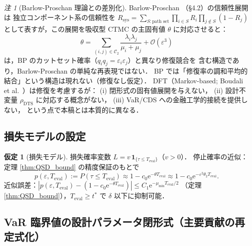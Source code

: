 \documentclass[12pt,a4paper]{article}
\theoremstyle{plain}
\theoremstyle{definition}
\newtheorem{assumption}[theorem]{仮定}
\theoremstyle{remark}
\newtheorem{remark}[theorem]{注}
\newcommand{\calO}{\mathcal{O}}
\newcommand{\eps}{\varepsilon}
\newcommand{\e}{\mathrm{e}}
\newcommand{\calCtwo}{\mathcal{C}_2}
\newcommand{\rhoDTS}{\rho_{\mathrm{DTS}}}
\newcommand{\Teval}{T_{\mathrm{eval}}}
\begin{document}
\begin{remark}[Barlow-Proschan 理論との差別化]
  Barlow-Proschan \cite{barlow1965}（§4.2）の信頼性展開は
  独立コンポーネント系の信頼性を
  $R_{\mathrm{sys}} = \sum_{S:\text{path set}}\prod_{i\in S}R_i\prod_{j\notin S}(1-R_j)$
  として表すが，この展開を吸収型 CTMC の主固有値 $\theta$ に対応させると：
  \begin{equation}
    \theta = \sum_{(i,j)\in\calCtwo}\frac{\lambda_i\lambda_j}{\mu_i+\mu_j} + \calO(\eps^3)
  \end{equation}
  は，BP のカットセット確率（$q_iq_j=\eps_i\eps_j$）と異なり修復競合を
  含む構造であり，Barlow-Proschan の単純な再表現ではない．
  BP では「修復率の調和平均的結合」という構造は現れない（修復なし仮定）．
  DFT（Markov-based; Boudali et al.~\cite{boudali2010}）は修復を考慮するが：
  (i) 閉形式の固有値展開を与えない，
  (ii) 設計不変量 $\rhoDTS$ に対応する概念がない，
  (iii) VaR/CDS への金融工学的接続を提供しない，
  という点で本稿とは本質的に異なる．
\end{remark}

\subsection{損失モデルの設定}

\begin{assumption}[損失モデル]\label{ass:loss}
  損失確率変数 $L = v\,\mathbf{1}_{\{\tau\le\Teval\}}$（$v>0$）．
  停止確率の近似：定理 \ref{thm:QSD_bound} の精度保証のもとで
  \begin{equation}\label{eq:stop_prob}
    p(\eps,\Teval)
    := P(\tau\le\Teval)
    \approx 1-c_0\e^{-\theta\Teval}
    \approx 1-c_0\e^{-\eps^2\theta_2\Teval}.
  \end{equation}
  近似誤差：$|p(\eps,\Teval)-(1-c_0\e^{-\theta\Teval})|\le C_1\e^{-\mu_{\min}\Teval/2}$
  （定理 \ref{thm:QSD_bound}），$\Teval\ge t^*$ で $\delta$ 以下に抑制可能．
\end{assumption}

\subsection{VaR 臨界値の設計パラメータ閉形式（主要貢献の再定式化）}
\end{document}
